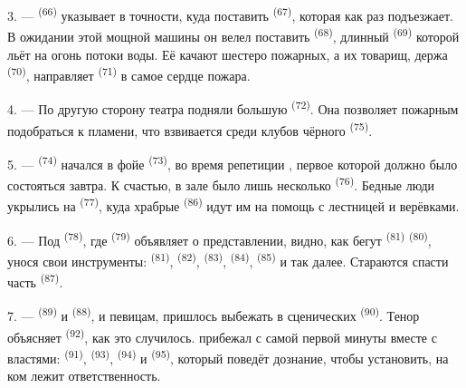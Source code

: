 3. ---  \textsuperscript{(66)} указывает в точности, куда поставить
 \textsuperscript{(67)}, которая как раз подъезжает. В
ожидании этой мощной машины он велел поставить 
\textsuperscript{(68)}, длинный  \textsuperscript{(69)} которой льёт на
огонь потоки воды. Её качают шестеро пожарных, а их товарищ, держа
 \textsuperscript{(70)}, направляет 
\textsuperscript{(71)} в самое сердце пожара.

4. --- По другую сторону театра подняли большую 
\textsuperscript{(72)}. Она позволяет пожарным подобраться к пламени, что
взвивается среди клубов чёрного  \textsuperscript{(75)}.

\VUsaut{5.0mm}
\VUsaut{3.4mm}

5. ---  \textsuperscript{(74)} начался в фойе 
\textsuperscript{(73)}, во время репетиции , первое
 которой должно было состояться завтра. К счастью, в
зале было лишь несколько  \textsuperscript{(76)}. Бедные люди
укрылись на  \textsuperscript{(77)}, куда храбрые 
\textsuperscript{(86)} идут им на помощь с лестницей и верёвками.

6. --- Под  \textsuperscript{(78)}, где 
\textsuperscript{(79)} объявляет о представлении, видно, как бегут
 \textsuperscript{(81)}  \textsuperscript{(80)},
унося свои инструменты:  \textsuperscript{(81)}, 
\textsuperscript{(82)},  \textsuperscript{(83)}, 
\textsuperscript{(84)},  \textsuperscript{(85)} и так далее. Стараются
спасти часть  \textsuperscript{(87)}.

7. ---  \textsuperscript{(89)} и  \textsuperscript{(88)},
 и певицам, пришлось выбежать в сценических 
\textsuperscript{(90)}. Тенор объясняет  \textsuperscript{(92)}, как
это случилось.  прибежал с самой первой минуты вместе с
властями:  \textsuperscript{(91)}, 
\textsuperscript{(93)},  \textsuperscript{(94)} и
 \textsuperscript{(95)}, который поведёт дознание, чтобы
установить, на ком лежит ответственность.
\VUsaut{6.0mm}
\VUfilet{22mm}
